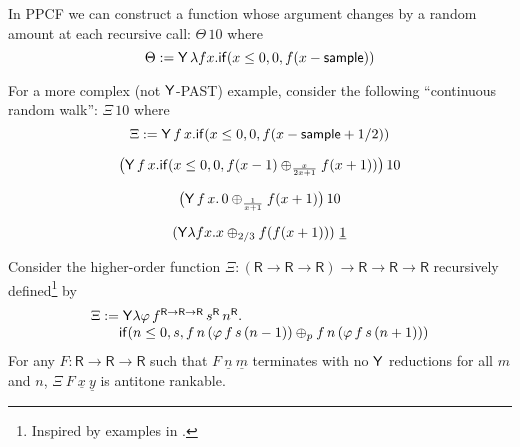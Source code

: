 \begin{example}\label{ex:raven complex}
In PPCF we can construct a function whose argument changes by a random amount at each recursive call: $\Theta \, 10$ where
\[
\Theta := \mathsf{Y} \, \lambda f x . \mathsf{if}(x \leq 0, 0, f(x - \mathsf{sample}))
\]

For a more complex (not $\mathsf{Y}$-PAST) example, consider the following ``continuous random walk'': $\Xi \, 10$ where
\[
\Xi := \mathsf{Y} \, f \, x . \mathsf{if}(x \leq 0, 0, f(x - \mathsf{sample} + 1/2)) 
\]
\end{example}

\begin{example}
\label{ex:Fair-in-the-limit random walk}\cite[\S 5.3]{DBLP:journals/pacmpl/McIverMKK18}
\[
\big
(\mathsf{Y} \, f \, x . 
\mathsf{if}(x \leq 0, 0, f(x - 1) \oplus_{\frac{x}{2x+1}} f(x + 1)) \big)
\, 10
\]
\end{example}

\begin{example}
\label{ex:escaping spline}\cite[\S 5.4]{DBLP:journals/pacmpl/McIverMKK18}
\[
\big(\mathsf{Y} \, f \, x . \,
0 \oplus_{\frac{1}{x+1}} f(x + 1) 
\big)
\, 10
\]
\end{example}

\begin{example} \label{ex:non-affine recursion}
\[
(\mathsf{Y} \lambda f x. x \oplus_{2/3} f (f (x + 1)))\ \underline 1
\]
\end{example}


\begin{example} \label{ex:higher-order recursion}
Consider the higher-order function
$\Xi : (\textsf{R} \to \textsf{R} \to \textsf{R}) \to \textsf{R} \to \textsf{R} \to \textsf{R}$
recursively defined\footnote{Inspired by examples in \cite{DBLP:journals/pacmpl/BurnOR18,DBLP:conf/lics/OngW19}.} by
\[
\begin{array}{l}
\Xi := \mathsf{Y} \lambda \varphi \, f^{\textsf{R} \to \textsf{R} \to \textsf{R}} \, s^\textsf{R} \, n^\textsf{R} . \\
\qquad\mathsf{if}(n \leq 0, s, 
f \, n \, (\varphi \, f \, s \, (n - 1))
\oplus_p
f \, n \, (\varphi \, f \, s \, (n + 1))
)
\end{array}
\]
For any $F : \textsf{R} \to \textsf{R} \to \textsf{R}$ such that $F\ \underline n\ \underline m$ terminates with no $\mathsf{Y}$ reductions for all $m$ and $n$, $\Xi\ F\ \underline x\ \underline y$ is antitone rankable.
\end{example}

